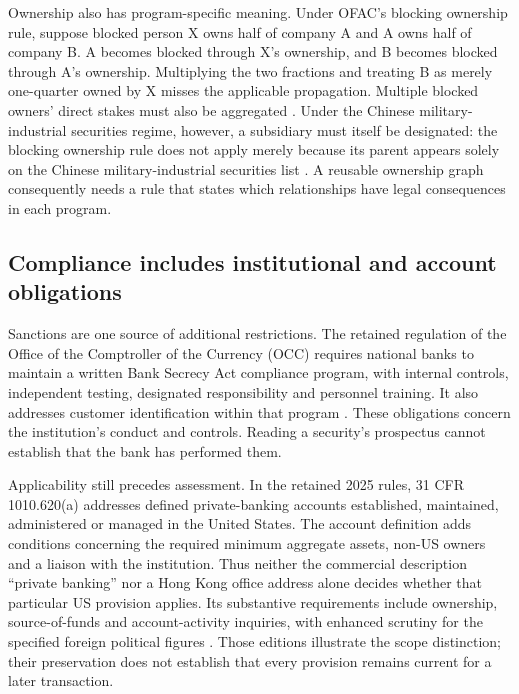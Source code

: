 Ownership also has program-specific meaning. Under OFAC's blocking ownership
rule, suppose blocked person X owns half of company A and A owns half of company
B. A becomes blocked through X's ownership, and B becomes blocked through A's
ownership. Multiplying the two fractions and treating B as merely one-quarter
owned by X misses the applicable propagation. Multiple blocked owners' direct
stakes must also be aggregated \citep[FAQ 401, examples 1--3]{ofacownership2014}.
Under the Chinese military-industrial securities regime, however, a subsidiary
must itself be designated: the blocking ownership rule does not apply merely
because its parent appears solely on the Chinese military-industrial securities list
\citep[FAQ 857]{ofaccmicsubs2021}. A reusable ownership graph consequently needs
a rule that states which relationships have legal consequences in each program.

\subsection{Compliance includes institutional and account obligations}

Sanctions are one source of additional restrictions. The retained regulation of
the Office of the Comptroller of the Currency (OCC) requires national banks to maintain a written Bank Secrecy Act
compliance program, with internal controls, independent testing, designated
responsibility and personnel training. It also addresses customer identification
within that program \citep[12 CFR 21.21(c)--(d), 2025 edition]{occbsa2025}.
These obligations concern the institution's conduct and controls. Reading a
security's prospectus cannot establish that the bank has performed them.

Applicability still precedes assessment. In the retained 2025 rules,
31 CFR 1010.620(a) addresses defined private-banking accounts established,
maintained, administered or managed in the United States. The account definition
adds conditions concerning the required minimum aggregate assets, non-US owners
and a liaison with the institution. Thus neither the commercial description
``private banking'' nor a Hong Kong office address alone decides whether that
particular US provision applies. Its substantive requirements include ownership,
source-of-funds and account-activity inquiries, with enhanced scrutiny for the
specified foreign political figures
\citep[31 CFR 1010.605(m), 2025 edition]{fincenprivatebankdef2025}
\citep[31 CFR 1010.620(a)--(d), 2025 edition]{fincenprivatebankdd2025}.
Those editions illustrate the scope distinction; their preservation does not
establish that every provision remains current for a later transaction.

